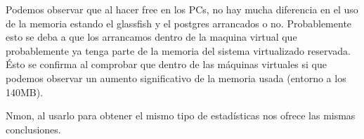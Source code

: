 \documentclass[a4paper, 10pt]{article}
\begin{document}
Podemos observar que al hacer free en los PCs, no hay mucha diferencia en el uso de la memoria estando el glassfish y el postgres arrancados o no. Probablemente esto se deba a que los arrancamos dentro de la maquina virtual que probablemente ya tenga parte de la memoria del sistema virtualizado reservada. Ésto se confirma al comprobar que dentro de las máquinas virtuales si que podemos observar un aumento significativo de la memoria usada (entorno a los 140MB).

Nmon, al usarlo para obtener el mismo tipo de estadísticas nos ofrece las mismas conclusiones.
\end{document}
